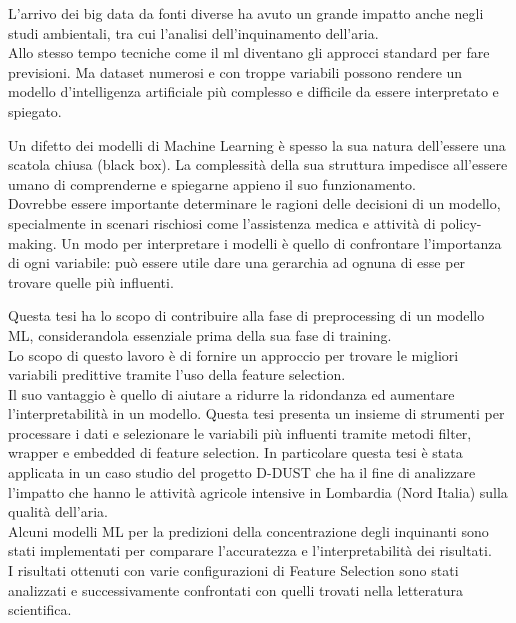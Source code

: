 L'arrivo dei big data da fonti diverse ha avuto un grande impatto anche negli studi ambientali, tra cui l'analisi dell'inquinamento dell'aria.\\
Allo stesso tempo tecniche come il \gls{ml} diventano gli approcci standard per fare previsioni.
Ma dataset numerosi e con troppe variabili possono rendere un modello d'intelligenza artificiale più complesso e difficile da essere interpretato e spiegato.\par
Un difetto dei modelli di Machine Learning è spesso la sua natura dell'essere una scatola chiusa (black box). La complessità della sua struttura impedisce all'essere umano di comprenderne e spiegarne appieno il suo funzionamento.\\
Dovrebbe essere importante determinare le ragioni delle decisioni di un modello, specialmente in scenari rischiosi come l'assistenza medica e attività di policy-making.
Un modo per interpretare i modelli è quello di confrontare l'importanza di ogni variabile: può essere utile dare una gerarchia ad ognuna di esse per trovare quelle più influenti. \par
Questa tesi ha lo scopo di contribuire alla fase di preprocessing di un modello ML, considerandola essenziale prima della sua fase di training.\\
Lo scopo di questo lavoro è di fornire un approccio per trovare le migliori variabili predittive tramite l'uso della feature selection. \\
Il suo vantaggio è quello di aiutare a ridurre la ridondanza ed aumentare l'interpretabilità in un modello.
Questa tesi presenta un insieme di strumenti per processare i dati e selezionare le variabili più influenti tramite metodi filter, wrapper e embedded di feature selection.
In particolare questa tesi è stata applicata in un caso studio del progetto D-DUST che ha il fine di analizzare l'impatto che hanno le attività agricole intensive in Lombardia (Nord Italia) sulla qualità dell'aria.\\ 
Alcuni modelli ML per la predizioni della concentrazione degli inquinanti sono stati implementati per comparare l'accuratezza e l'interpretabilità dei risultati.\\
I risultati ottenuti con varie configurazioni di Feature Selection sono stati analizzati e successivamente confrontati con quelli trovati nella letteratura scientifica.
\\
